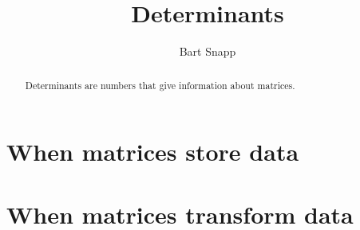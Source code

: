 \documentclass{ximera}
\author{Bart Snapp}
\title{Determinants}
\begin{document}
\begin{abstract}
  Determinants are numbers that give information about matrices.
\end{abstract}
\maketitle


\section{When matrices store data}



\section{When matrices transform data}
\end{document}
